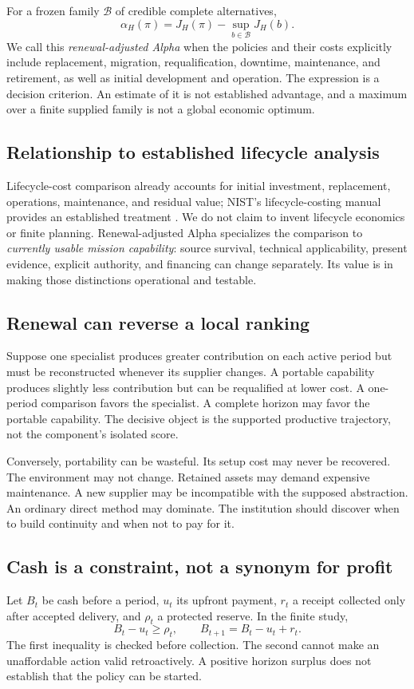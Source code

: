 For a frozen family $\mathcal B$ of credible complete alternatives,
\begin{equation}
 \alpha_H(\pi)=J_H(\pi)-\sup_{b\in\mathcal B}J_H(b).
 \label{eq:alpha}
\end{equation}
We call this \emph{renewal-adjusted Alpha} when the policies and their costs explicitly include replacement, migration, requalification, downtime, maintenance, and retirement, as well as initial development and operation. The expression is a decision criterion. An estimate of it is not established advantage, and a maximum over a finite supplied family is not a global economic optimum.

\subsection{Relationship to established lifecycle analysis}
Lifecycle-cost comparison already accounts for initial investment, replacement, operations, maintenance, and residual value; NIST's lifecycle-costing manual provides an established treatment \citep{lcc}. We do not claim to invent lifecycle economics or finite planning. Renewal-adjusted Alpha specializes the comparison to \emph{currently usable mission capability}: source survival, technical applicability, present evidence, explicit authority, and financing can change separately. Its value is in making those distinctions operational and testable.

\subsection{Renewal can reverse a local ranking}
Suppose one specialist produces greater contribution on each active period but must be reconstructed whenever its supplier changes. A portable capability produces slightly less contribution but can be requalified at lower cost. A one-period comparison favors the specialist. A complete horizon may favor the portable capability. The decisive object is the supported productive trajectory, not the component's isolated score.

Conversely, portability can be wasteful. Its setup cost may never be recovered. The environment may not change. Retained assets may demand expensive maintenance. A new supplier may be incompatible with the supposed abstraction. An ordinary direct method may dominate. The institution should discover when to build continuity and when not to pay for it.

\subsection{Cash is a constraint, not a synonym for profit}
Let $B_t$ be cash before a period, $u_t$ its upfront payment, $r_t$ a receipt collected only after accepted delivery, and $\rho_t$ a protected reserve. In the finite study,
\begin{equation}
 B_t-u_t\geq\rho_t,\qquad B_{t+1}=B_t-u_t+r_t.
 \label{eq:cash}
\end{equation}
The first inequality is checked before collection. The second cannot make an unaffordable action valid retroactively. A positive horizon surplus does not establish that the policy can be started.

